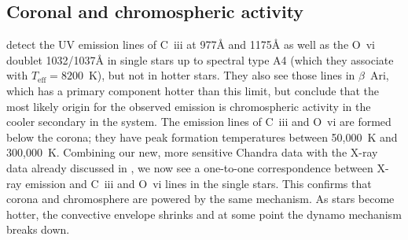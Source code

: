 \documentclass[linenumbers]{aastex631}
\begin{document}


\subsection{Coronal and chromospheric activity}
\cite{2002ApJ...579..800S} detect the UV emission lines
of C~{\sc iii} at 977\AA{} and 1175\AA{} as well as the O~{\sc vi}
doublet 1032/1037\AA{} in single stars up to spectral type A4 (which
they associate with $T_\mathrm{eff}=8200$~K), but not in hotter stars. They also see those
lines in $\beta$~Ari, which has a primary component hotter than this
limit, but conclude that the most likely origin for the observed
emission is chromospheric activity in the cooler secondary in the
system. The emission lines of C~{\sc iii} and O~{\sc vi} are formed
below the corona; they have peak formation temperatures between
50,000~K and 300,000~K. Combining our new, more sensitive Chandra data with the X-ray data already discussed in \cite{2002ApJ...579..800S}, 
we now see a one-to-one correspondence between X-ray emission and
C~{\sc iii} and O~{\sc vi} lines in the single stars. This confirms that corona and chromosphere are powered by the same mechanism.
 As stars become hotter, the convective envelope shrinks and at some point the dynamo mechanism breaks down.
 
\end{document}
